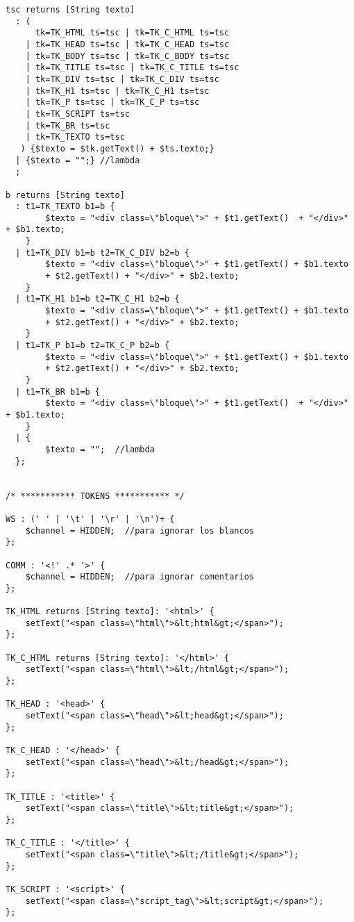 {\begin{verbatim}
tsc returns [String texto]
  : (
      tk=TK_HTML ts=tsc | tk=TK_C_HTML ts=tsc
    | tk=TK_HEAD ts=tsc | tk=TK_C_HEAD ts=tsc
    | tk=TK_BODY ts=tsc | tk=TK_C_BODY ts=tsc
    | tk=TK_TITLE ts=tsc | tk=TK_C_TITLE ts=tsc
    | tk=TK_DIV ts=tsc | tk=TK_C_DIV ts=tsc   
    | tk=TK_H1 ts=tsc | tk=TK_C_H1 ts=tsc    
    | tk=TK_P ts=tsc | tk=TK_C_P ts=tsc
    | tk=TK_SCRIPT ts=tsc
    | tk=TK_BR ts=tsc
    | tk=TK_TEXTO ts=tsc
   ) {$texto = $tk.getText() + $ts.texto;}
  | {$texto = "";} //lambda
  ;
  
b returns [String texto]
  : t1=TK_TEXTO b1=b {
        $texto = "<div class=\"bloque\">" + $t1.getText()  + "</div>" + $b1.texto;
    }
  | t1=TK_DIV b1=b t2=TK_C_DIV b2=b {
        $texto = "<div class=\"bloque\">" + $t1.getText() + $b1.texto 
        + $t2.getText() + "</div>" + $b2.texto;
    }
  | t1=TK_H1 b1=b t2=TK_C_H1 b2=b {
        $texto = "<div class=\"bloque\">" + $t1.getText() + $b1.texto 
        + $t2.getText() + "</div>" + $b2.texto;
    }
  | t1=TK_P b1=b t2=TK_C_P b2=b {
        $texto = "<div class=\"bloque\">" + $t1.getText() + $b1.texto 
        + $t2.getText() + "</div>" + $b2.texto;
    }
  | t1=TK_BR b1=b {
        $texto = "<div class=\"bloque\">" + $t1.getText()  + "</div>" + $b1.texto;
    } 
  | {
        $texto = "";  //lambda
  }; 
  

/* *********** TOKENS *********** */

WS : (' ' | '\t' | '\r' | '\n')+ {
    $channel = HIDDEN;  //para ignorar los blancos
}; 
      
COMM : '<!' .* '>' {
    $channel = HIDDEN;  //para ignorar comentarios
};               

TK_HTML returns [String texto]: '<html>' {
    setText("<span class=\"html\">&lt;html&gt;</span>");
};

TK_C_HTML returns [String texto]: '</html>' {
    setText("<span class=\"html\">&lt;/html&gt;</span>");
};

TK_HEAD : '<head>' {
    setText("<span class=\"head\">&lt;head&gt;</span>");
};

TK_C_HEAD : '</head>' {
    setText("<span class=\"head\">&lt;/head&gt;</span>");
};

TK_TITLE : '<title>' {
    setText("<span class=\"title\">&lt;title&gt;</span>");
};

TK_C_TITLE : '</title>' {
    setText("<span class=\"title\">&lt;/title&gt;</span>");
};

TK_SCRIPT : '<script>' {
    setText("<span class=\"script_tag\">&lt;script&gt;</span>");
};


\end{verbatim}}
